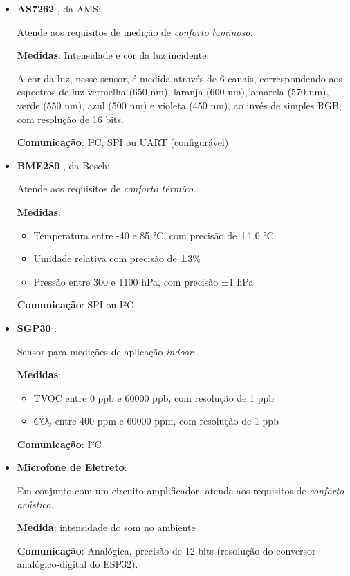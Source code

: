 \documentclass[../monografia.tex]{subfiles}
\begin{document}
\begin{itemize}
\item \textbf{AS7262} \cite{as7262}, da AMS: 

Atende aos requisitos de medição de \textit{conforto luminoso}. 

\textbf{Medidas}: Intensidade e cor da luz incidente.

A cor da luz, nesse sensor, é medida através de 6 canais, correspondendo aos espectros de luz vermelha (650 nm), laranja (600 nm), amarela (570 nm), verde (550 nm), azul (500 nm) e violeta (450 nm), ao invés de simples RGB, com resolução de 16 bits.

\textbf{Comunicação}: I²C, SPI ou UART (configurável)

\item \textbf{BME280} \cite{bme280}, da Bosch: 

Atende aos requisitos de \textit{conforto térmico}. 

\textbf{Medidas}: 
    \begin{itemize}
    \item Temperatura entre -40 e 85 °C, com precisão de ±1.0 °C
    \item Umidade relativa com precisão de ±3\%
    \item Pressão entre 300 e 1100 hPa, com precisão ±1 hPa
    \end{itemize}

\textbf{Comunicação}: SPI ou I²C

\item \textbf{SGP30} \cite{sgp30}:

Sensor para medições de aplicação \textit{indoor}. 

\textbf{Medidas}:
    \begin{itemize}
    \item TVOC entre 0 ppb e 60000 ppb, com resolução de 1 ppb
    \item $CO_{2}$ entre 400 ppm e 60000 ppm, com resolução de 1 ppb
    \end{itemize}

\textbf{Comunicação}: I²C

\item \textbf{Microfone de Eletreto}:

Em conjunto com um circuito amplificador, atende aos requisitos de \textit{conforto acústico}. 

\textbf{Medida}: intensidade do som no ambiente

\textbf{Comunicação}: Analógica, precisão de 12 bits (resolução do conversor analógico-digital do ESP32). 
\end{itemize}
\end{document}
